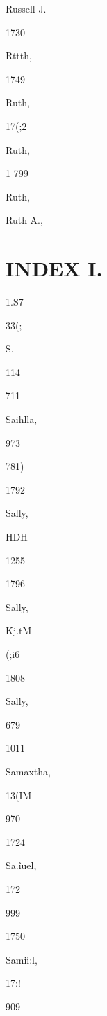 {{Russell J. 


1730 


Rttth, 


1749 


Ruth, 


17(;2 


Ruth, 


1 799 


Ruth, 




Ruth A., 



\chapter{INDEX I.}



1.S7 


33(; 




S. 




114 








711 




Saihlla, 


973 


781) 


1792 


Sally, 


HDH 


1255 


1796 


Sally, 


Kj.tM 


(;i6 


1808 


Sally, 


679 


1011 




Samaxtha, 


13(IM 


970 


1724 


Sa.\^iuel, 


172 


999 


1750 


Samii:l, 


17:! 


909 


}}
